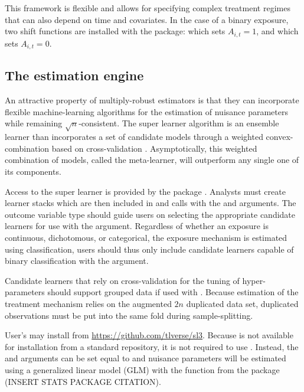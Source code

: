 \documentclass[]{jss}
\begin{document}
This framework is flexible and allows for specifying complex treatment
regimes that can also depend on time and covariates. In the case of a
binary exposure, two shift functions are installed with
the package:  which sets \(A_{i, t} = 1\), and
 which sets \(A_{i, t} = 0\).

\hypertarget{the-estimation-engine}{%
\subsection{The estimation engine}\label{the-estimation-engine}}

An attractive property of multiply-robust estimators is that they can
incorporate flexible machine-learning algorithms for the estimation of
nuisance parameters while remaining \(\sqrt{n}\)-consistent. The super
learner algorithm is an ensemble learner than incorporates a set of
candidate models through a weighted convex-combination based on
cross-validation \citep{laanSuperLearner2007}. Asymptotically, this
weighted combination of models, called the meta-learner, will outperform
any single one of its components.

Access to the super learner is provided by the  package \citep{coyleSl3}. Analysts must create  learner stacks which
are then included in  and  calls with the  and
 arguments. The outcome variable type should guide
users on selecting the appropriate candidate learners for use with the
 argument. Regardless of whether an exposure is
continuous, dichotomous, or categorical, the exposure mechanism is
estimated using classification, users should thus only include candidate
learners capable of binary classification with the 
argument.

Candidate learners that rely on cross-validation
for the tuning of hyper-parameters should support grouped data if used with . Because
estimation of the treatment mechanism relies on the augmented \(2n\) duplicated
data set, duplicated observations must be put into the same fold during sample-splitting. 

User's may install  from \url{https://github.com/tlverse/sl3}.
Because  is not available for installation from a standard
repository, it is not required to use . Instead, the  and 
 arguments can be set equal to
 and nuisance parameters will be estimated using a
generalized linear model (GLM) with the  function from the
 package (INSERT STATS PACKAGE CITATION).
\end{document}
